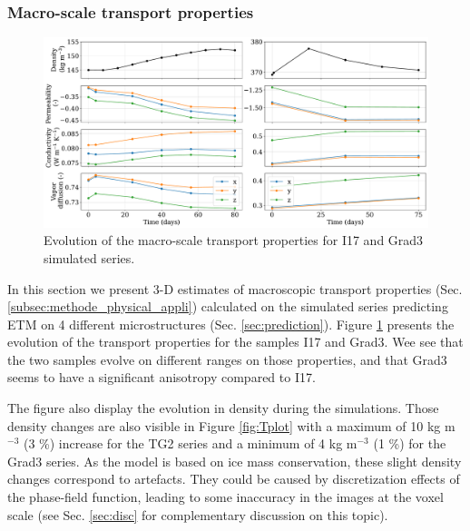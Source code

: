 \documentclass[draft,ms]{agujournal2019}
\begin{document}
\subsubsection{Macro-scale transport properties}

\begin{figure}
    \centering
    \includegraphics[width=\linewidth]{Figures/4images_transport_temps_court.pdf}
    \caption{Evolution of the macro-scale transport properties for I17 and Grad3 simulated series.}
    \label{fig:transport_temps}
\end{figure}

In this section we present 3-D estimates of macroscopic transport properties (Sec. \ref{subsec:methode_physical_appli}) calculated on the simulated series predicting ETM on 4 different microstructures (Sec. \ref{sec:prediction}). Figure \ref{fig:transport_temps} presents the evolution of the transport properties for the samples I17 and Grad3. Wee see that the two samples evolve on different ranges on those properties, and that Grad3 seems to have a significant anisotropy compared to I17.

The figure also display the evolution in density during the simulations. Those density changes are also visible in Figure \ref{fig:Tplot} with a maximum of 10 kg m$^{-3}$ (3 \%) increase for the TG2 series and a minimum of 4 kg m$^{-3}$ (1 \%) for the Grad3 series. As the model is based on ice mass conservation, these slight density changes correspond to artefacts. They could be caused by discretization effects of the phase-field function, leading to some inaccuracy in the images at the voxel scale (see Sec. \ref{sec:disc} for complementary discussion on this topic).
\end{document}
